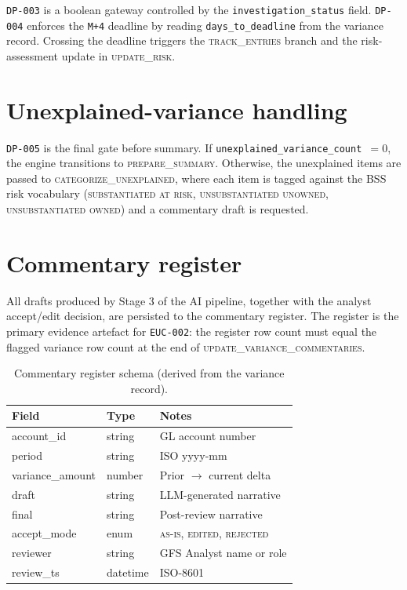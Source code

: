 \documentclass[11pt,a4paper,twoside]{report}
\newcommand{\stateid}[1]{\textsc{\lowercase{#1}}}
\begin{document}
\texttt{DP-003} is a boolean gateway controlled by the
\texttt{investigation\_status} field. \texttt{DP-004} enforces the
\texttt{M+4} deadline by reading \texttt{days\_to\_deadline} from the
variance record. Crossing the deadline triggers the
\stateid{TRACK\_ENTRIES} branch and the risk-assessment update in
\stateid{UPDATE\_RISK}.

\section{Unexplained-variance handling}

\texttt{DP-005} is the final gate before summary. If
\texttt{unexplained\_variance\_count $= 0$}, the engine transitions to
\stateid{PREPARE\_SUMMARY}. Otherwise, the unexplained items are
passed to \stateid{CATEGORIZE\_UNEXPLAINED}, where each item is
tagged against the BSS risk vocabulary (\textsc{substantiated at risk},
\textsc{unsubstantiated unowned}, \textsc{unsubstantiated owned}) and
a commentary draft is requested.

\section{Commentary register}

All drafts produced by Stage 3 of the AI pipeline, together with the
analyst accept/edit decision, are persisted to the commentary
register. The register is the primary evidence artefact for
\texttt{EUC-002}: the register row count must equal the flagged
variance row count at the end of \stateid{UPDATE\_VARIANCE\_COMMENTARIES}.

\begin{table}[htbp]
\caption{Commentary register schema (derived from the variance
record).}\label{tab:commentary-register}
\centering
\small
\begin{tabularx}{\linewidth}{@{}llX@{}}
\toprule
\textbf{Field} & \textbf{Type} & \textbf{Notes} \\ \midrule
account\_id      & string  & GL account number \\
period           & string  & ISO yyyy-mm \\
variance\_amount & number  & Prior $\to$ current delta \\
draft            & string  & LLM-generated narrative \\
final            & string  & Post-review narrative \\
accept\_mode     & enum    & \textsc{as-is}, \textsc{edited}, \textsc{rejected} \\
reviewer         & string  & GFS Analyst name or role \\
review\_ts       & datetime & ISO-8601 \\
\bottomrule
\end{tabularx}
\end{table}
\end{document}
